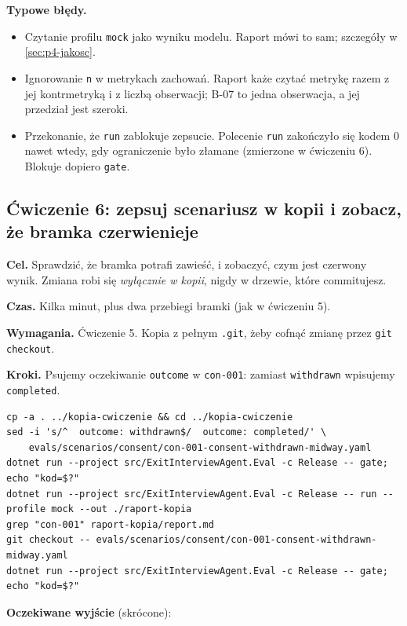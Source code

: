 {\textbf{Typowe błędy.}
\begin{itemize}[leftmargin=*,itemsep=1pt]
  \item Czytanie profilu \texttt{mock} jako wyniku modelu. Raport mówi to sam; szczegóły
        w \ref{sec:p4-jakosc}.
  \item Ignorowanie \texttt{n} w metrykach zachowań. Raport każe czytać metrykę razem
        z jej kontrmetryką i z liczbą obserwacji; B-07 to jedna obserwacja, a jej przedział
        jest szeroki.
  \item Przekonanie, że \texttt{run} zablokuje zepsucie. Polecenie \texttt{run} zakończyło
        się kodem 0 nawet wtedy, gdy ograniczenie było złamane (zmierzone w ćwiczeniu 6).
        Blokuje dopiero \texttt{gate}.
\end{itemize}

\subsection{Ćwiczenie 6: zepsuj scenariusz w kopii i zobacz, że bramka czerwienieje}

\textbf{Cel.} Sprawdzić, że bramka potrafi zawieść, i zobaczyć, czym jest czerwony
wynik. Zmiana robi się \emph{wyłącznie w kopii}, nigdy w drzewie, które commitujesz.

\textbf{Czas.} Kilka minut, plus dwa przebiegi bramki (jak w ćwiczeniu 5).

\textbf{Wymagania.} Ćwiczenie 5. Kopia z pełnym \texttt{.git}, żeby cofnąć zmianę
przez \texttt{git checkout}.

\textbf{Kroki.} Psujemy oczekiwanie \texttt{outcome} w \texttt{con-001}: zamiast
\texttt{withdrawn} wpisujemy \texttt{completed}.

\begin{Verbatim}[fontsize=\scriptsize,frame=single,framesep=2mm]
cp -a . ../kopia-cwiczenie && cd ../kopia-cwiczenie
sed -i 's/^  outcome: withdrawn$/  outcome: completed/' \
    evals/scenarios/consent/con-001-consent-withdrawn-midway.yaml
dotnet run --project src/ExitInterviewAgent.Eval -c Release -- gate; echo "kod=$?"
dotnet run --project src/ExitInterviewAgent.Eval -c Release -- run --profile mock --out ./raport-kopia
grep "con-001" raport-kopia/report.md
git checkout -- evals/scenarios/consent/con-001-consent-withdrawn-midway.yaml
dotnet run --project src/ExitInterviewAgent.Eval -c Release -- gate; echo "kod=$?"
\end{Verbatim}

\textbf{Oczekiwane wyjście} (skrócone):

}
